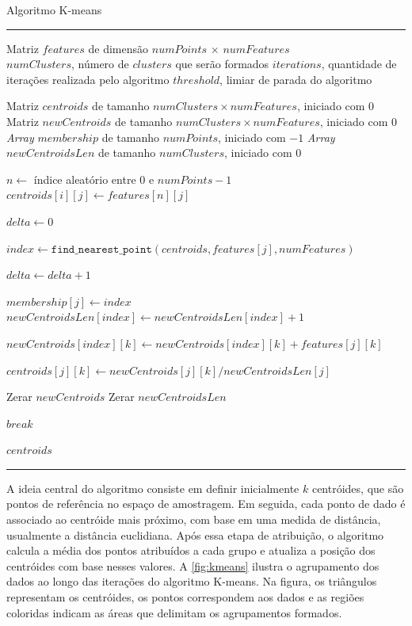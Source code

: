 \begin{algorithm}[htb!]
	\caption{Algoritmo K-means}
	\label{alg:kmeans}
	\hrule
	\begin{algorithmic}[1]
		\REQUIRE Matriz $features$ de dimensão $numPoints$ $\times$ $numFeatures$ \\
		\REQUIRE $numClusters$, número de $clusters$ que serão formados
		\REQUIRE $iterations$, quantidade de iterações realizada pelo algoritmo
		\REQUIRE $threshold$, limiar de parada do algoritmo

		\STATE Matriz $centroids$ de tamanho $numClusters \times numFeatures$, iniciado com $0$
		\STATE Matriz $newCentroids$ de tamanho $numClusters \times numFeatures$, iniciado com $0$
		\STATE \textit{Array} $membership$ de tamanho $numPoints$, iniciado com $-1$
		\STATE \textit{Array} $newCentroidsLen$ de tamanho $numClusters$, iniciado com $0$

		\STATE $n \gets$ índice aleatório entre $0$ e $numPoints - 1$
		\STATE $\textit{centroids}[i][j] \gets \textit{features}[n][j]$
		\ENDFOR
		\ENDFOR

		\STATE $\textit{delta} \gets 0$

		\STATE $index \gets \texttt{find\_nearest\_point}(centroids, features[j], numFeatures)$

		\STATE $delta \gets delta + 1$
		\ENDIF

		\STATE $membership[j] \gets index$
		\STATE $newCentroidsLen[index] \gets newCentroidsLen[index] + 1$

		\STATE $newCentroids[index][k] \gets newCentroids[index][k] + features[j][k]$
		\ENDFOR
		\ENDFOR

		\STATE $centroids[j][k] \gets newCentroids[j][k] / newCentroidsLen[j]$
		\ENDFOR
		\ENDIF
		\ENDFOR

		\STATE Zerar $newCentroids$
		\STATE Zerar $newCentroidsLen$

		\STATE $break$
		\ENDIF
		\ENDFOR

		\RETURN  $centroids$
	\end{algorithmic}
	\hrule
	\fonte{}
\end{algorithm}

A ideia central do algoritmo consiste em definir inicialmente $k$ centróides, que são pontos de referência no espaço de amostragem. Em seguida, cada ponto de dado é associado ao centróide mais próximo, com base em uma medida de distância, usualmente a distância euclidiana. Após essa etapa de atribuição, o algoritmo calcula a média dos pontos atribuídos a cada grupo e atualiza a posição dos centróides com base nesses valores. A \autoref{fig:kmeans} ilustra o agrupamento dos dados ao longo das iterações do algoritmo K-means. Na figura, os triângulos representam os centróides, os pontos correspondem aos dados e as regiões coloridas indicam as áreas que delimitam os agrupamentos formados.

